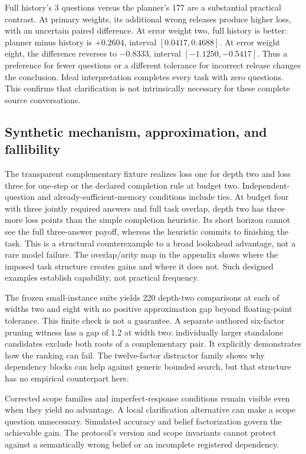 \documentclass[11pt]{article}
\begin{document}
Full history's 3 questions versus the planner's 177 are a substantial practical contrast. At primary weights, its additional wrong releases produce higher loss, with an uncertain paired difference. At error weight two, full history is better: planner minus history is $+0.2604$, interval $[0.0417,0.4688]$. At error weight eight, the difference reverses to $-0.8333$, interval $[-1.1250,-0.5417]$. Thus a preference for fewer questions or a different tolerance for incorrect release changes the conclusion. Ideal interpretation completes every task with zero questions. This confirms that clarification is not intrinsically necessary for these complete source conversations.

\subsection{Synthetic mechanism, approximation, and fallibility}
The transparent complementary fixture realizes loss one for depth two and loss three for one-step or the declared completion rule at budget two. Independent-question and already-sufficient-memory conditions include ties. At budget four with three jointly required answers and full task overlap, depth two has three more loss points than the simple completion heuristic. Its short horizon cannot see the full three-answer payoff, whereas the heuristic commits to finishing the task. This is a structural counterexample to a broad lookahead advantage, not a rare model failure. The overlap/arity map in the appendix shows where the imposed task structure creates gains and where it does not. Such designed examples establish capability, not practical frequency.

The frozen small-instance suite yields 220 depth-two comparisons at each of widths two and eight with no positive approximation gap beyond floating-point tolerance. This finite check is not a guarantee. A separate authored six-factor pruning witness has a gap of 1.2 at width two: individually larger standalone candidates exclude both roots of a complementary pair. It explicitly demonstrates how the ranking can fail. The twelve-factor distractor family shows why dependency blocks can help against generic bounded search, but that structure has no empirical counterpart here.

Corrected scope families and imperfect-response conditions remain visible even when they yield no advantage. A local clarification alternative can make a scope question unnecessary. Simulated accuracy and belief factorization govern the achievable gain. The protocol's version and scope invariants cannot protect against a semantically wrong belief or an incomplete registered dependency.
\end{document}
